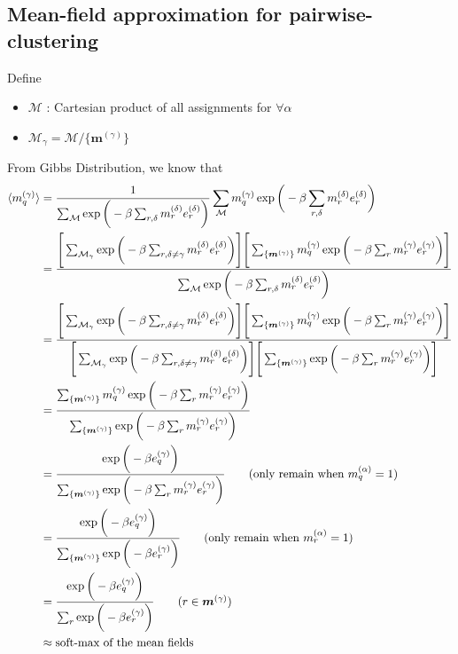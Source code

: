 \subsection{Mean-field approximation for pairwise-clustering}
Define
\begin{itemize}
	\item $\mathcal{M}$ : Cartesian product of all assignments for $\forall \alpha$
	\item $\mathcal{M}_\gamma = \mathcal{M} / \{ \boldsymbol{m}^{(\gamma)} \}$
\end{itemize}
From Gibbs Distribution, we know that 
\begin{align*}
	\langle m_q^{(\gamma)} \rangle &= \frac{1}{\sum_{\mathcal{M}} \exp{ \bigg( -\beta \sum_{r, \delta} m_r^{(\delta)} e_r^{(\delta)} \bigg) }} \sum_{\mathcal{M}} m_q^{(\gamma)}\exp{ \bigg( -\beta \sum_{r, \delta} m_r^{(\delta)} e_r^{(\delta)} \bigg) } \\
	&= \frac{
	\Bigg [ \sum_{\mathcal{M}_\gamma}\exp{ \bigg( -\beta \sum_{r, \delta \ne \gamma } m_r^{(\delta)} e_r^{(\delta)} \bigg) } \Bigg] \Bigg[  \sum_{\{ \boldsymbol{m}^{(\gamma)} \}} 
	m_q^{(\gamma)}\exp{ \bigg( -\beta \sum_{r} m_r^{(\gamma)} e_r^{(\gamma)} \bigg) }
	 \Bigg]
	}{\sum_{\mathcal{M}} \exp{ \bigg( -\beta \sum_{r, \delta} m_r^{(\delta)} e_r^{(\delta)} \bigg) }}\\
	&= \frac{
	\Bigg [ \sum_{\mathcal{M}_\gamma}\exp{ \bigg( -\beta \sum_{r, \delta \ne \gamma } m_r^{(\delta)} e_r^{(\delta)} \bigg) } \Bigg] \Bigg[  \sum_{\{ \boldsymbol{m}^{(\gamma)} \}} 
	m_q^{(\gamma)}\exp{ \bigg( -\beta \sum_{r} m_r^{(\gamma)} e_r^{(\gamma)} \bigg) }
	 \Bigg]
	}{
	\Bigg [ \sum_{\mathcal{M}_\gamma}\exp{ \bigg( -\beta \sum_{r, \delta \ne \gamma } m_r^{(\delta)} e_r^{(\delta)} \bigg) } \Bigg] \Bigg[  \sum_{\{ \boldsymbol{m}^{(\gamma)} \}} 
	\exp{ \bigg( -\beta \sum_{r} m_r^{(\gamma)} e_r^{(\gamma)} \bigg) }
	 \Bigg]
	 }\\
	 &= \frac{
	 \sum_{\{ \boldsymbol{m}^{(\gamma)} \}} 
	m_q^{(\gamma)}\exp{ \bigg( -\beta \sum_{r} m_r^{(\gamma)} e_r^{(\gamma)} \bigg) }
	}{
	 \sum_{\{ \boldsymbol{m}^{(\gamma)} \}} 
	\exp{ \bigg( -\beta \sum_{r} m_r^{(\gamma)} e_r^{(\gamma)} \bigg) }
	 }\\
	  &= \frac{
	 \exp{ \bigg( -\beta  e_q^{(\gamma)} \bigg) }
	}{
	 \sum_{\{ \boldsymbol{m}^{(\gamma)} \}} 
	\exp{ \bigg( -\beta \sum_{r} m_r^{(\gamma)} e_r^{(\gamma)} \bigg) }
	 } \tag*{(only remain when $m_q^{(\alpha)} = 1 $)} \\
	 &= \frac{
	 \exp{ \bigg( -\beta  e_q^{(\gamma)} \bigg) }
	}{
	 \sum_{\{ \boldsymbol{m}^{(\gamma)} \}} 
	\exp{ \bigg( -\beta  e_r^{(\gamma)} \bigg) }
	 } \tag*{(only remain when $m_r^{(\alpha)} = 1 $)} \\
	 	 &= \frac{
	 \exp{ \bigg( -\beta  e_q^{(\gamma)} \bigg) }
	}{
	 \sum_{r} 
	\exp{ \bigg( -\beta  e_r^{(\gamma)} \bigg) }
	 } \tag*{($r \in \boldsymbol{m}^{(\gamma)}$)} \\
	 &\approx \text{soft-max of the mean fields}
\end{align*}

